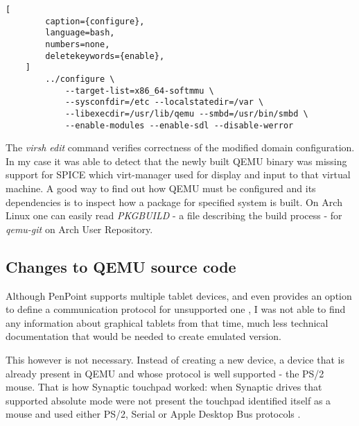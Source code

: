 \begin{codeblock}
    \begin{lstlisting}[
        caption={configure},
        language=bash,
        numbers=none,
        deletekeywords={enable},
    ]
        ../configure \
            --target-list=x86_64-softmmu \
            --sysconfdir=/etc --localstatedir=/var \
            --libexecdir=/usr/lib/qemu --smbd=/usr/bin/smbd \
            --enable-modules --enable-sdl --disable-werror
    \end{lstlisting}
\end{codeblock}

The \emph{virsh edit} command verifies correctness of the modified domain
configuration.  In my case it was able to detect that the newly built QEMU
binary was missing support for SPICE which virt-manager used for display and
input to that virtual machine.  A good way to find out how QEMU must be
configured and its dependencies is to inspect how a package for specified system
is built.  On Arch Linux one can easily read \emph{PKGBUILD} - a file describing
the build process - for \emph{qemu-git} on Arch User Repository.

\subsection{Changes to QEMU source code}


Although PenPoint supports multiple tablet devices, and even provides an option
to define a communication protocol for unsupported one \cite{godevtools}, I was
not able to find any information about graphical tablets from that time, much
less technical documentation that would be needed to create emulated version.

This however is not necessary.  Instead of creating a new device, a device that
is already present in QEMU and whose protocol is well supported - the PS/2
mouse.  That is how Synaptic touchpad worked: when Synaptic drives that
supported absolute mode were not present the touchpad identified itself as
a mouse and used either PS/2, Serial or Apple Desktop Bus protocols
\cite{synapticsinterfacing}.







